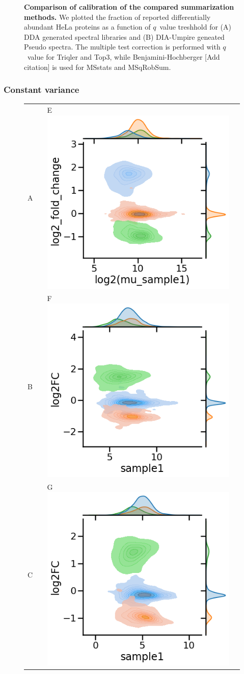 \documentclass[10pt,letterpaper]{article}
\begin{document}
\begin{figure}[hbt]
\begin{tabular}{lclc}
    \end{tabular}
  \caption{{\bf Comparison of calibration of the compared summarization methods.} We plotted the fraction of reported differentially abundant HeLa proteins as a function of $q$~value treshhold for (A) DDA generated spectral libraries and (B) DIA-Umpire geneated Pseudo spectra. The multiple test correction is performed with $q$~value for Triqler and Top3, while Benjamini-Hochberger [Add citation] is used for MSstats and MSqRobSum. \label{fig:frac_hela_vs_fdr}}
\end{figure}


\iffalse
\subsubsection*{Constant variance}

\begin{figure}[hbt]
    \centering
    \begin{tabular}{lclc} 
        A  & &%
        E \includegraphics[width=0.35\linewidth]{../../result/report_plots/diann_scatter_triqler.png} & \\%
        B  & &%
        F \includegraphics[width=0.35\linewidth]{../../result/report_plots/diann_scatter_msqrobsum.png} & \\%
        C  & &%
        G \includegraphics[width=0.35\linewidth]{../../result/report_plots/diann_scatter_msstats.png} & \\%

\end{tabular}
\end{figure}
\end{document}
